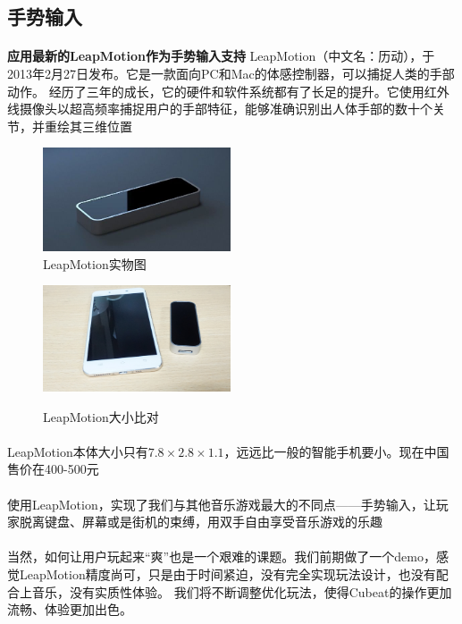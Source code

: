 \documentclass{article} \usepackage{CJK}
\begin{document}
\subsection{手势输入}
\paragraph{}
\textbf{应用最新的LeapMotion作为手势输入支持}
LeapMotion（中文名：历动），于2013年2月27日发布。它是一款面向PC和Mac的体感控制器，可以捕捉人类的手部动作。
经历了三年的成长，它的硬件和软件系统都有了长足的提升。它使用红外线摄像头以超高频率捕捉用户的手部特征，能够准确识别出人体手部的数十个关节，并重绘其三维位置
\begin{figure}[H]
\begin{minipage}{0.5\linewidth}
  \includegraphics[width=15em]{leap.png}\\
  \caption{LeapMotion实物图}\label{3-1}
\end{minipage}
\begin{minipage}{0.5\linewidth}
  \includegraphics[width=15em]{leapCompare.png}\\
  \caption{LeapMotion大小比对}\label{3-2}
\end{minipage}
\end{figure}
\paragraph{}
LeapMotion本体大小只有$7.8\times2.8\times1.1$，远远比一般的智能手机要小。现在中国售价在400-500元
\paragraph{}
使用LeapMotion，实现了我们与其他音乐游戏最大的不同点——手势输入，让玩家脱离键盘、屏幕或是街机的束缚，用双手自由享受音乐游戏的乐趣
\paragraph{}
当然，如何让用户玩起来“爽”也是一个艰难的课题。我们前期做了一个demo，感觉LeapMotion精度尚可，只是由于时间紧迫，没有完全实现玩法设计，也没有配合上音乐，没有实质性体验。
我们将不断调整优化玩法，使得Cubeat的操作更加流畅、体验更加出色。
\end{document}
